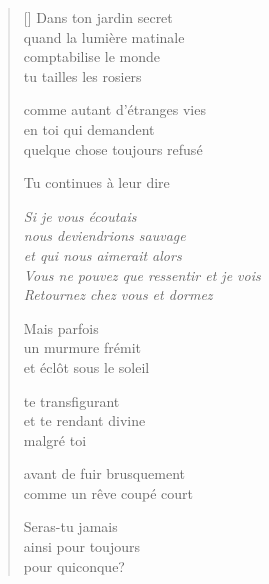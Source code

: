 \documentclass[12pt,a4paper]{article}
\begin{document}
\begin{verse}[\versewidth]
  Dans ton jardin secret \\
  quand la lumière matinale \\
  comptabilise le monde \\
  tu tailles les rosiers

  comme autant d'étranges vies \\
  en toi qui demandent \\
  quelque chose toujours refusé

  Tu continues à leur dire

  \emph{Si je vous écoutais \\
  nous deviendrions sauvage \\
  et qui nous aimerait alors \\
  Vous ne pouvez que ressentir et je vois \\
  Retournez chez vous et dormez}

  Mais parfois \\
  un murmure frémit \\
  et éclôt sous le soleil

  te transfigurant \\
  et te rendant divine \\
  malgré toi

  avant de fuir brusquement \\
  comme un rêve coupé court

  Seras-tu jamais \\
  ainsi pour toujours \\
  pour quiconque?
\end{verse}


\newpage

\poemtitle{}

\settowidth{\versewidth}{Je brandis mon oriflamme comme une voile}

\bigskip
\end{document}

